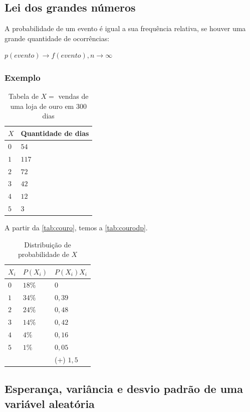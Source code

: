 \documentclass[a4paper]{article}
\begin{document}
	\subsection{Lei dos grandes números}
	
	A probabilidade de um evento é igual a sua frequência relativa, se houver uma grande quantidade de ocorrências:
	
	$p(evento) \rightarrow f(evento), n \rightarrow \infty$
	
	\subsubsection{Exemplo}
	
	\begin{table}[]
		\centering
		\caption{Tabela de $X =$ vendas de uma loja de  ouro em $300$ dias}
		\label{tab:couro}
		\begin{tabular}{l|l}
			\textbf{$X$} & \textbf{Quantidade de dias} \\ \hline
			$0$ & $54$ \\
			$1$ & $117$ \\
			$2$ & $72$ \\
			$3$ & $42$ \\
			$4$ & $12$ \\
			$5$ & $3$
		\end{tabular}
	\end{table}

	A partir da \autoref{tab:couro}, temos a \autoref{tab:courodp}.
	
	\begin{table}[]
		\centering
		\caption{Distribuição de probabilidade de $X$}
		\label{tab:courodp}
		\begin{tabular}{l|l|l}
			\textbf{$X_i$} & \textbf{$P(X_i)$} & \textbf{$P(X_i)X_i$} \\ \hline
			$0$ & $18\%$ & $0$ \\
			$1$ & $34\%$ & $0,39$ \\
			$2$ & $24\%$ & $0,48$ \\
			$3$ & $14\%$ & $0,42$ \\
			$4$ & $4\%$ & $0,16$ \\
			$5$ & $1\%$ & $0,05$ \\
			& & (+) $1,5$
		\end{tabular}
	\end{table}

	\subsection{Esperança, variância e desvio padrão de uma variável aleatória}
	
	
	
	
	
	
		
	
\end{document}

